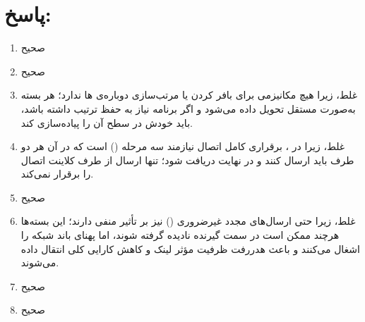 \section*{پاسخ:}

\begin{enumerate}
\item صحیح
\item صحیح
\item غلط، زیرا  هیچ مکانیزمی برای بافر کردن یا مرتب‌سازی دوباره‌ی ها ندارد؛ هر بسته به‌صورت مستقل تحویل داده می‌شود و اگر برنامه نیاز به حفظ ترتیب داشته باشد، باید خودش در سطح  آن را پیاده‌سازی کند.
\item غلط، زیرا در ، برقراری کامل اتصال نیازمند سه مرحله () است که در آن هر دو طرف باید  ارسال کنند و در نهایت  دریافت شود؛ تنها ارسال  از طرف کلاینت اتصال را برقرار نمی‌کند.
\item صحیح
\item غلط، زیرا حتی ارسال‌های مجدد غیرضروری () نیز بر  تأثیر منفی دارند؛ این بسته‌ها هرچند ممکن است در سمت گیرنده نادیده گرفته شوند، اما پهنای باند شبکه را اشغال می‌کنند و باعث هدررفت ظرفیت مؤثر لینک و کاهش کارایی کلی انتقال داده می‌شوند.
\item صحیح
\item صحیح
\end{enumerate}
